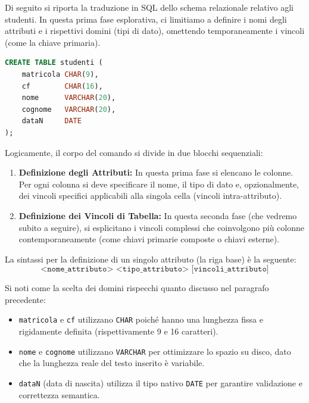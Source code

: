 \begin{example}
Di seguito si riporta la traduzione in SQL dello schema relazionale relativo agli studenti. In questa prima fase esplorativa, ci limitiamo a definire i nomi degli attributi e i rispettivi domini (tipi di dato), omettendo temporaneamente i vincoli (come la chiave primaria).

\begin{lstlisting}[language=SQL, basicstyle=\ttfamily\small, keywordstyle=\color{blue}\bfseries]
CREATE TABLE studenti (
    matricola CHAR(9),
    cf        CHAR(16),
    nome      VARCHAR(20),
    cognome   VARCHAR(20),
    dataN     DATE
);
\end{lstlisting}

Logicamente, il corpo del comando si divide in due blocchi sequenziali:

\begin{enumerate}
    \item \textbf{Definizione degli Attributi:} In questa prima fase si elencano le colonne. Per ogni colonna si deve specificare il nome, il tipo di dato e, opzionalmente, dei vincoli specifici applicabili alla singola cella (vincoli intra-attributo).
    \item \textbf{Definizione dei Vincoli di Tabella:} In questa seconda fase (che vedremo subito a seguire), si esplicitano i vincoli complessi che coinvolgono più colonne contemporaneamente (come chiavi primarie composte o chiavi esterne).
\end{enumerate}

\medskip

La sintassi per la definizione di un singolo attributo (la riga base) è la seguente:
$$ \texttt{<nome\_attributo> <tipo\_attributo> [vincoli\_attributo]} $$


Si noti come la scelta dei domini rispecchi quanto discusso nel paragrafo precedente:
\begin{itemize}
    \item \texttt{matricola} e \texttt{cf} utilizzano \texttt{CHAR} poiché hanno una lunghezza fissa e rigidamente definita (rispettivamente 9 e 16 caratteri).
    \item \texttt{nome} e \texttt{cognome} utilizzano \texttt{VARCHAR} per ottimizzare lo spazio su disco, dato che la lunghezza reale del testo inserito è variabile.
    \item \texttt{dataN} (data di nascita) utilizza il tipo nativo \texttt{DATE} per garantire validazione e correttezza semantica.
\end{itemize}
\end{example}

